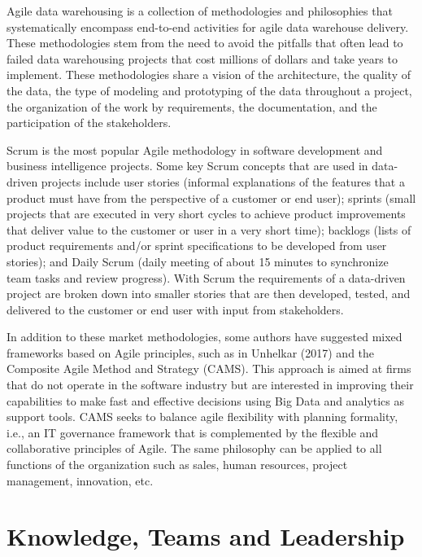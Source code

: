 \documentclass[
  letterpaper,
  DIV=11,
  numbers=noendperiod]{scrreprt}
\begin{document}
Agile data warehousing is a collection of methodologies and philosophies
that systematically encompass end-to-end activities for agile data
warehouse delivery. These methodologies stem from the need to avoid the
pitfalls that often lead to failed data warehousing projects that cost
millions of dollars and take years to implement. These methodologies
share a vision of the architecture, the quality of the data, the type of
modeling and prototyping of the data throughout a project, the
organization of the work by requirements, the documentation, and the
participation of the stakeholders.

Scrum is the most popular Agile methodology in software development and
business intelligence projects. Some key Scrum concepts that are used in
data-driven projects include user stories (informal explanations of the
features that a product must have from the perspective of a customer or
end user); sprints (small projects that are executed in very short
cycles to achieve product improvements that deliver value to the
customer or user in a very short time); backlogs (lists of product
requirements and/or sprint specifications to be developed from user
stories); and Daily Scrum (daily meeting of about 15 minutes to
synchronize team tasks and review progress). With Scrum the requirements
of a data-driven project are broken down into smaller stories that are
then developed, tested, and delivered to the customer or end user with
input from stakeholders.

In addition to these market methodologies, some authors have suggested
mixed frameworks based on Agile principles, such as in Unhelkar (2017)
and the Composite Agile Method and Strategy (CAMS). This approach is
aimed at firms that do not operate in the software industry but are
interested in improving their capabilities to make fast and effective
decisions using Big Data and analytics as support tools. CAMS seeks to
balance agile flexibility with planning formality, i.e., an IT
governance framework that is complemented by the flexible and
collaborative principles of Agile. The same philosophy can be applied to
all functions of the organization such as sales, human resources,
project management, innovation, etc.

\hypertarget{knowledge-teams-and-leadership}{%
\section{Knowledge, Teams and
Leadership}\label{knowledge-teams-and-leadership}}
\end{document}
